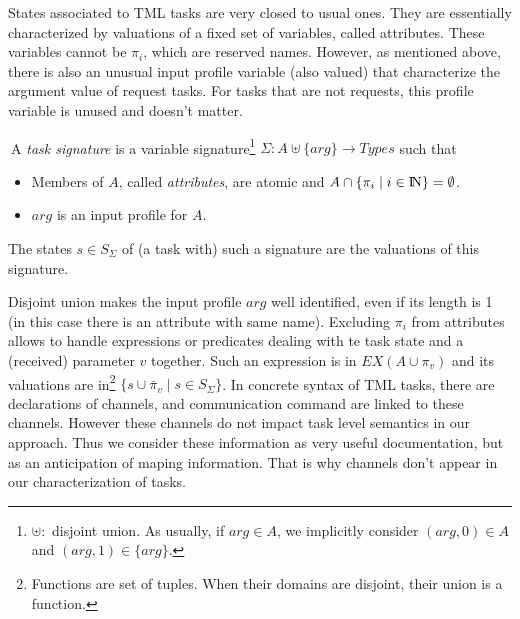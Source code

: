 \documentclass{article}
\newcommand{\NAT}{\mbox{\normalfont I$\!$N}}
\begin{document}
States associated to TML tasks are very closed to usual ones. They are essentially characterized by valuations of a fixed set of variables, called attributes. These variables cannot be $\pi_i$, which are reserved names. However, as mentioned above,  there is also an unusual input profile variable (also valued) that characterize the argument value of request tasks. For tasks that are not requests, this profile variable is unused and doesn't matter.
\begin{definition}\label{def-tsksig}$~$A {\em task signature} is a variable signature\footnote{$\uplus:$ disjoint union. As usually, if $arg\in A$, we implicitly consider $(arg,0)\in A$ and $(arg,1)\in\{arg\}$.} $\Sigma:A\uplus\{arg\}\rightarrow Types$ such that
\begin{itemize}
\item Members of $A$, called {\em attributes}, are atomic and $A\cap \{\pi_i\mid i\in \NAT\}=\emptyset$.
\item $arg$ is an input profile for $A$.
\end{itemize}
The states $s\in S_{\Sigma}$ of (a task with) such a signature are the valuations of this signature.
\end{definition}
Disjoint union makes the input profile $arg$ well identified, even if its length is 1 (in this case there is an attribute with same name\footnotemark[9]). Excluding $\pi_i$ from attributes allows to handle expressions or predicates dealing with te task state and a (received) parameter $v$ together. Such an expression is in $EX(A\cup\pi_v)$ and its valuations are in\footnote{Functions are set of tuples. When their domains are disjoint, their union is a function.} $\{s\cup\bar\pi_v\mid s\in S_{\Sigma}\}$. In concrete syntax of TML tasks, there are declarations of channels, and communication command are linked to these channels. However these channels do not impact task level semantics in our approach. Thus we consider these information as very useful documentation, but as an anticipation of maping information. That is why channels don't appear in our characterization of tasks.

\end{document}
